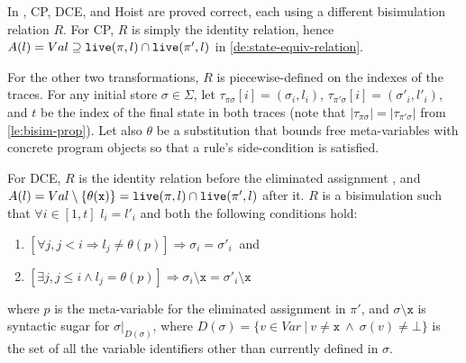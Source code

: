 \begin{myproof}
In \cite{Lacey02}, CP, DCE, and Hoist are proved correct, each using a different bisimulation relation $R$. 
For CP, $R$ is simply the identity relation, hence $A(l)=Val\supseteq \text{${\tt live}$}(\pi,l)\cap \text{${\tt live}$}(\pi',l)$ in \mydefinition\ref{de:state-equiv-relation}.

For the other two transformations, $R$ is piecewise-defined on the indexes of the traces. For any initial store $\sigma\in \Sigma$, let $\tau_{\pi\sigma}[i]=(\sigma_i,l_i)$, $\tau_{\pi'\sigma}[i]=(\sigma'_i,l'_i)$, and $t$ be the index of the final state in both traces (note that $|\tau_{\pi\sigma}|=|\tau_{\pi'\sigma}|$ from \ref{le:bisim-prop}). Let also $\theta$ be a substitution that bounds free meta-variables with concrete program objects so that a rule's side-condition is satisfied.

For DCE, $R$ is the identity relation before the eliminated assignment , and $A(l)=Val\setminus\{\theta(\text{${\tt x}$})\}=\text{${\tt live}$}(\pi,l)\cap \text{${\tt live}$}(\pi',l)$ after it. $R$ is a bisimulation such that $\forall i\in[1,t]$ $l_i=l'_i$ and both the following conditions hold:
\begin{enumerate}
 \item $[\forall j, j<i \Rightarrow l_j\neq \theta(p)] \Rightarrow \sigma_i=\sigma'_i~$ and
 \item $[\exists j, j\leq i \wedge l_j = \theta(p)] \Rightarrow \sigma_i\setminus\texttt{x}=\sigma'_i\setminus\texttt{x}$
\end{enumerate}
\noindent where $p$ is the meta-variable for the eliminated assignment in $\pi'$, and $\sigma\setminus\texttt{x}$ is syntactic sugar for $\sigma\vert_{D(\sigma)}$, where $D(\sigma)=\{v\in Var ~|~ v\neq \texttt{x} ~\wedge~ \sigma(v)\neq\bot\}$ is the set of all the variable identifiers other than  currently defined in $\sigma$.


\end{myproof}
